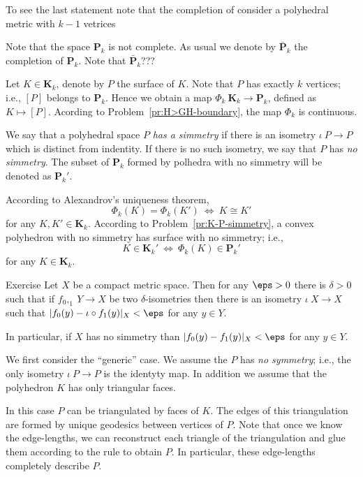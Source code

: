 To see the last statement note that the completion of consider a polyhedral metric with $k-1$ vetrices



Note that the space $\mathbf{P}_k$ is not complete.
As usual we denote by $\bar{\mathbf{P}}_k$ the completion of $\mathbf{P}_k$.
Note that $\bar{\mathbf{P}}_k$???


Let $K\in \mathbf{K}_k$,
denote by $P$ the surface of $K$.
Note that $P$ has exactly $k$ vertices;
i.e.,  $[P]$ belongs to $\mathbf{P}_k$.
Hence we obtain a map $\Phi_k\:\mathbf{K}_k\to \mathbf{P}_k$, defined as $K\mapsto [P]$.
Acording to Problem~\ref{pr:H>GH-boundary}, the map $\Phi_k$ is continuous.

We say that a polyhedral space $P$ \emph{has a simmetry} if there is an isometry $\iota\:P\to P$ which is distinct from indentity.
If there is no such isometry, we say that  $P$ has \emph{no simmetry}.
The subset of $\mathbf{P}_k$ formed by polhedra with no simmetry will be denoted as $\mathbf{P}_k'$.

According to Alexandrov's uniqueness theorem,
$$\Phi_k(K)=\Phi_k(K')\ \iff\ K\cong K'$$
for any $K,K'\in \mathbf{K}_k$.
According to Problem~\ref{pr:K-P-simmetry}, a convex polyhedron with no simmetry has surface with no simmetry; i.e., 
$$K\in   \mathbf{K}_k'\ \iff\ \Phi_k(K)\in \mathbf{P}_k'$$
for any $K\in \mathbf{K}_k$.

\begin{thm}{Exercise}
Let $X$ be a compact metric space.
Then for any $\eps>0$ there is $\delta>0$ such that 
if $f_0,_1\:Y\to X$ be two $\delta$-isometries then 
 there is an isometry $\iota\:X\to X$ such that
$|f_0(y)-\iota\circ f_1(y)|_X<\eps$ for any $y\in Y$.

In particular, if $X$ has no simmetry than 
$|f_0(y)-f_1(y)|_X<\eps$ for any $y\in Y$.
\end{thm}













We first consider the ``generic'' case.
We assume  the $P$ has \emph{no symmetry};
i.e., the only isometry $\iota\: P\to P$ is the identyty map.
In addition we assume that the polyhedron $K$ has only triangular faces.

In this case $P$ can be triangulated by faces of $K$.
The edges of this triangulation are formed by unique geodesics between vertices of $P$.
Note that once we know the edge-lengths, 
we can reconstruct each triangle of the triangulation
and glue them according to the rule to obtain $P$.
In particular, these edge-lengths completely describe $P$.

